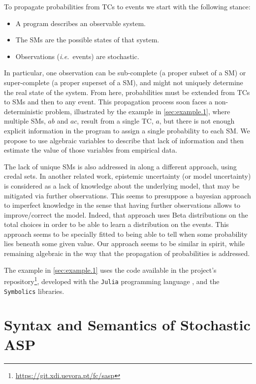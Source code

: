 \documentclass{tlp}
\renewcommand{\cite}{\citep}
\begin{document}
To propagate probabilities from \aclp{TC} to events we start with the
following stance:
\begin{itemize}
\item A program describes an observable system.
\item The \aclp{SM} are the possible states of that system.
\item Observations (\textit{i.e.}\ events) are stochastic.
\end{itemize}

In particular, one observation can be sub-complete (a proper subset of
a \ac{SM}) or super-complete (a proper superset of a \ac{SM}), and
might not uniquely determine the real state of the system.  From here,
probabilities must be extended from \acp{TC} to \acp{SM} and then to
any event.
%
This propagation process soon faces a non-deterministic problem,
illustrated by the example in \cref{sec:example.1}, where multiple
\acp{SM}, \(ab\) and \(ac\), result from a single \ac{TC}, \(a\), but
there is not enough explicit information in the program to assign a
single probability to each \ac{SM}.
%
We propose to use algebraic variables to describe that lack of
information and then estimate the value of those variables from
empirical data.

The lack of unique \acp{SM} is also addressed in \cite{cozman2020joy}
along a different approach, using credal sets.
%
In another related work, \cite{verreet2022inference} epistemic
uncertainty (or model uncertainty) is considered as a lack of
knowledge about the underlying model, that may be mitigated via
further observations.  This seems to presuppose a bayesian approach to
imperfect knowledge in the sense that having further observations
allows to improve/correct the model.  Indeed, that approach uses Beta
distributions on the total choices in order to be able to learn a
distribution on the events.
%
This approach seems to be specially fitted to being able to tell when
some probability lies beneath some given value.  Our approach seems to
be similar in spirit, while remaining algebraic in the way that the
propagation of probabilities is addressed.

The example in \cref{sec:example.1} uses the code available in the
project's
repository\footnote{\url{https://git.xdi.uevora.pt/fc/sasp}},
developed with the \texttt{Julia} programming language
\cite{bezanson2017julia}, and the \texttt{Symbolics}
\cite{gowda2021high} libraries.


\section{Syntax and Semantics of Stochastic ASP}
\label{sec:syntax.and.semantics}
\end{document}
